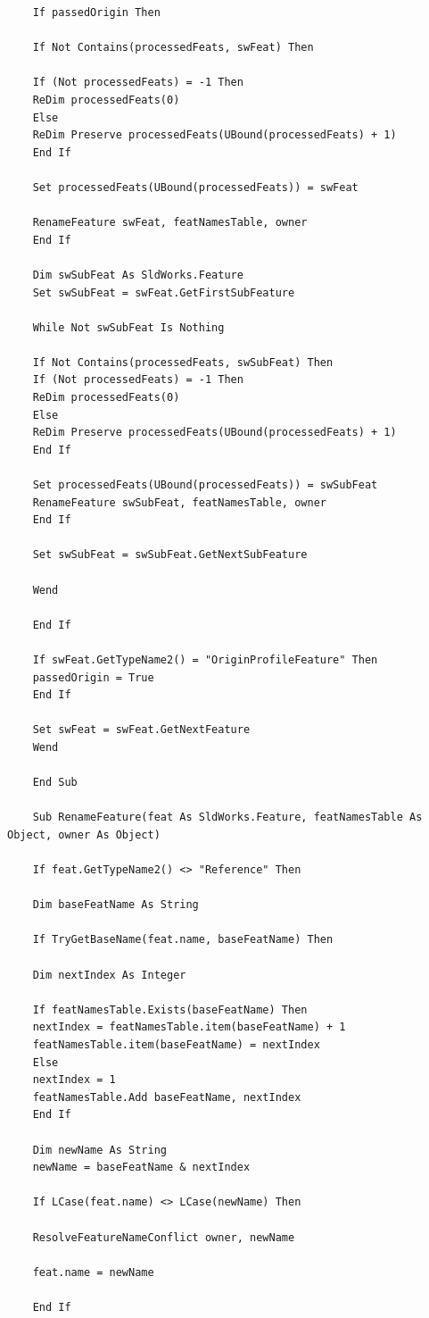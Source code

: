 \documentclass[12pt,letterpaper,final]{report}
\begin{document}
\begin{lstlisting}
	If passedOrigin Then
	
	If Not Contains(processedFeats, swFeat) Then
	
	If (Not processedFeats) = -1 Then
	ReDim processedFeats(0)
	Else
	ReDim Preserve processedFeats(UBound(processedFeats) + 1)
	End If
	
	Set processedFeats(UBound(processedFeats)) = swFeat
	
	RenameFeature swFeat, featNamesTable, owner
	End If
	
	Dim swSubFeat As SldWorks.Feature
	Set swSubFeat = swFeat.GetFirstSubFeature
	
	While Not swSubFeat Is Nothing
	
	If Not Contains(processedFeats, swSubFeat) Then
	If (Not processedFeats) = -1 Then
	ReDim processedFeats(0)
	Else
	ReDim Preserve processedFeats(UBound(processedFeats) + 1)
	End If
	
	Set processedFeats(UBound(processedFeats)) = swSubFeat
	RenameFeature swSubFeat, featNamesTable, owner
	End If
	
	Set swSubFeat = swSubFeat.GetNextSubFeature
	
	Wend
	
	End If
	
	If swFeat.GetTypeName2() = "OriginProfileFeature" Then
	passedOrigin = True
	End If
	
	Set swFeat = swFeat.GetNextFeature
	Wend
	
	End Sub
	
	Sub RenameFeature(feat As SldWorks.Feature, featNamesTable As Object, owner As Object)
	
	If feat.GetTypeName2() <> "Reference" Then
	
	Dim baseFeatName As String
	
	If TryGetBaseName(feat.name, baseFeatName) Then
	
	Dim nextIndex As Integer
	
	If featNamesTable.Exists(baseFeatName) Then
	nextIndex = featNamesTable.item(baseFeatName) + 1
	featNamesTable.item(baseFeatName) = nextIndex
	Else
	nextIndex = 1
	featNamesTable.Add baseFeatName, nextIndex
	End If
	
	Dim newName As String
	newName = baseFeatName & nextIndex
	
	If LCase(feat.name) <> LCase(newName) Then
	
	ResolveFeatureNameConflict owner, newName
	
	feat.name = newName
	
	End If
	

\end{lstlisting}
\end{document}
